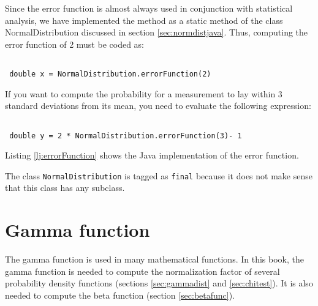 \documentclass[twoside]{book}
\begin{document}
Since the error function is almost always used in conjunction with
statistical analysis, we have implemented the method as a static
method of the class NormalDistribution discussed in section
\ref{sec:normdistjava}. Thus, computing the error function of 2
must be coded as:
\begin{codeExample}
\begin{verbatim}

 double x = NormalDistribution.errorFunction(2)
\end{verbatim}
\end{codeExample}
If you want to compute the probability for a measurement to lay
within 3 standard deviations from its mean, you need to evaluate
the following expression:
\begin{codeExample}
\begin{verbatim}

 double y = 2 * NormalDistribution.errorFunction(3)- 1
\end{verbatim}
\end{codeExample}
Listing \ref{lj:errorFunction} shows the Java implementation of
the error function.

The class {\tt NormalDistribution} is tagged as {\tt final}
because it does not make sense that this class has any subclass.

\begin{listing}
\label{lj:errorFunction}

\end{listing}

\section{Gamma function}
The gamma function is used in many mathematical functions. In this
book, the gamma function is needed to compute the normalization
factor of several probability density functions (\cf sections
\ref{sec:gammadist} and \ref{sec:chitest}). It is also needed to
compute the beta function (\cf section \ref{sec:betafunc}).
\end{document}
